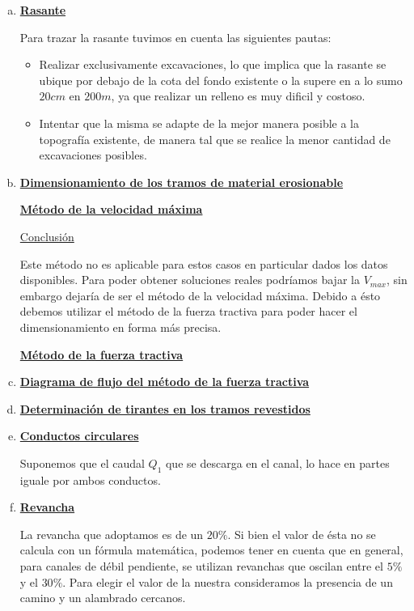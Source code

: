 \documentclass[10.5pt]{article}
\begin{document}
\begin{enumerate}[a)]
 \item \underline{\bf Rasante}
 
 Para trazar la rasante tuvimos en cuenta las siguientes pautas:
  \begin{itemize}
   \item Realizar exclusivamente excavaciones, lo que implica que la rasante se ubique por debajo de la cota del fondo existente o la supere
   en a lo sumo $20 cm$ en $200 m$, ya que realizar un relleno es muy dificil y costoso.
   \item Intentar que la misma se adapte de la mejor manera posible a la topografía existente, de manera tal que se realice la menor cantidad
   de excavaciones posibles.
  \end{itemize}
  
 \item \underline{\bf Dimensionamiento de los tramos de material erosionable}
    
  \vspace{1em}
  \underline{\bf Método de la velocidad máxima}
  
  
  
  
  
  \underline{Conclusión}
  
  Este método no es aplicable para estos casos en particular dados los datos disponibles.
  Para poder obtener soluciones reales podríamos bajar la $V_{max}$, sin embargo dejaría de ser el método de la velocidad máxima.
  Debido a ésto debemos utilizar el método de la fuerza tractiva para poder hacer el dimensionamiento en forma más precisa.
  
  \vspace{1em}
  \underline{\bf Método de la fuerza tractiva}
  
  
  
  
 
 \newpage
 \item \underline{\bf Diagrama de flujo del método de la fuerza tractiva}
   
   
   
 \item \underline{\bf Determinación de tirantes en los tramos revestidos}

   
   
   
 \item \underline{\bf Conductos circulares}
 
 Suponemos que el caudal $Q_1$ que se descarga en el canal, lo hace en partes iguale por ambos conductos.
 
 
 
 \item \underline{\bf Revancha}
   
  La revancha que adoptamos es de un $20\%$. Si bien el valor de ésta no se calcula con un fórmula matemática, podemos tener en cuenta que 
  en general, para canales de débil pendiente, se utilizan revanchas que oscilan entre el $5\%$ y el $30\%$. Para elegir el valor de la nuestra
  consideramos la presencia de un camino y un alambrado cercanos.
\end{enumerate}
  
\end{document}
